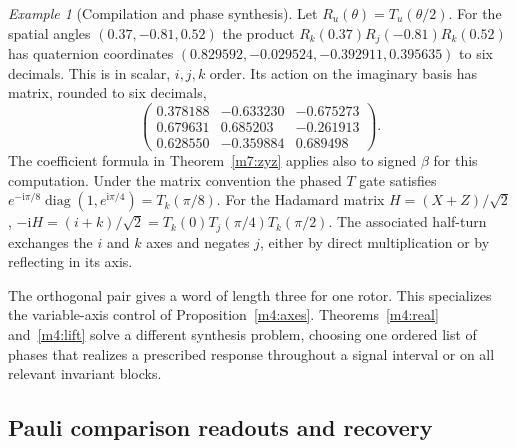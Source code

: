 \documentclass[11pt,reqno]{amsart}
\theoremstyle{definition}
\theoremstyle{remark}
\newtheorem{example}[theorem]{Example}
\numberwithin{equation}{section}
\begin{document}
\begin{example}[Compilation and phase synthesis]\label{m7:rotors}
Let $R_u(\theta)=T_u(\theta/2)$. For the spatial angles
$(0.37,-0.81,0.52)$ the product $R_k(0.37)R_j(-0.81)R_k(0.52)$
has quaternion coordinates $(0.829592,-0.029524,-0.392911,0.395635)$
to six decimals. This is in scalar, $i,j,k$ order. Its action on
the imaginary basis has matrix, rounded to six decimals,
\[
 \begin{pmatrix}
 0.378188&-0.633230&-0.675273\\
 0.679631&0.685203&-0.261913\\
 0.628550&-0.359884&0.689498
 \end{pmatrix}.
\]
The coefficient formula in Theorem~\ref{m7:zyz} applies also to
signed $\beta$ for this computation. Under the matrix convention
the phased $T$ gate satisfies
$e^{-\mathrm i\pi/8}\operatorname{diag}(1,e^{\mathrm i\pi/4})
=T_k(\pi/8)$. For the Hadamard matrix $H=(X+Z)/\sqrt2$,
$-\mathrm iH=(i+k)/\sqrt2=T_k(0)T_j(\pi/4)T_k(\pi/2)$.
The associated half-turn exchanges the $i$ and $k$ axes and negates
$j$, either by direct multiplication or by reflecting in its axis.

The orthogonal pair gives a word of length three for one rotor.
This specializes the variable-axis control of
Proposition~\ref{m4:axes}. Theorems~\ref{m4:real}
and~\ref{m4:lift} solve a different synthesis problem, choosing one
ordered list of phases that realizes a prescribed response throughout
a signal interval or on all relevant invariant blocks.
\end{example}

\subsection{Pauli comparison readouts and recovery}
\end{document}
